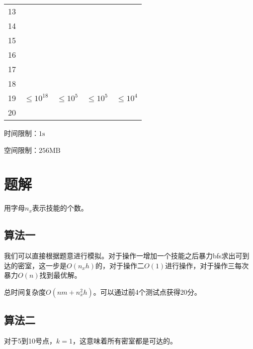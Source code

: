 \documentclass[11pt, a4paper]{article}
\begin{document}
\begin{center}
\begin{tabular}{|c|p{70pt}|p{70pt}|p{70pt}|p{70pt}|}
\cline{1-1}
13 &                                 &                              &                                &                              \\
\cline{1-1}
14 &                                 &                              &                                &                              \\
\cline{1-1}
15 &                                 &                              &                                &                              \\
\cline{1-1}
16 &                                 &                              &                                &                              \\
\cline{1-1}
17 &                                 &                              &                                &                              \\
\hline
18 & \multirow{3}{*}{$\leq 10^{18}$} & \multirow{3}{*}{$\leq 10^5$} & \multirow{3}{*}{$\leq 10^5$}   & \multirow{3}{*}{$\leq 10^4$} \\
\cline{1-1}
19 &                                 &                              &                                &                              \\
\cline{1-1}
20 &                                 &                              &                                &                              \\
\hline
\end{tabular}
\end{center}

时间限制：$1\text{s}$

空间限制：$256\text{MB}$

\section*{题解}
用字母$n_x$表示技能的个数。

\subsection*{算法一}
我们可以直接根据题意进行模拟。对于操作一增加一个技能之后暴力bfs求出可到达的密室，这一步是$O(n_x h)$的，对于操作二$O(1)$进行操作，对于操作三每次暴力$O(n)$找到最优解。

总时间复杂度$O(nm + n_x^2 h)$。可以通过前4个测试点获得20分。

\subsection*{算法二}
对于5到10号点，$k = 1$，这意味着所有密室都是可达的。
\end{document}
